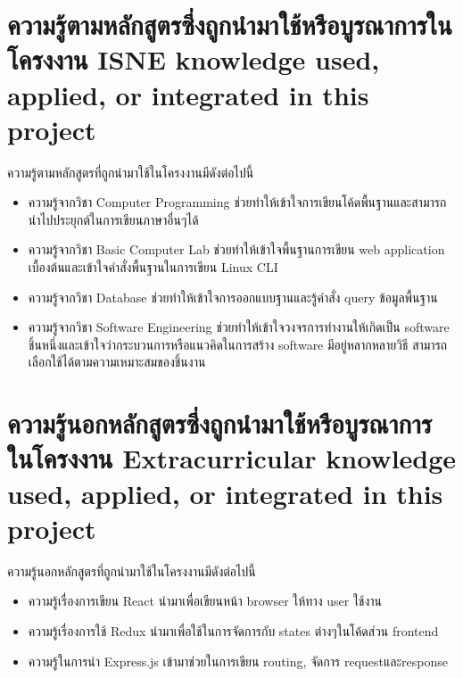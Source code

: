 \section{\ifcpe%
ความรู้ตามหลักสูตรซึ่งถูกนำมาใช้หรือบูรณาการในโครงงาน
\else%
ISNE knowledge used, applied, or integrated in this project
\fi
}

ความรู้ตามหลักสูตรที่ถูกนำมาใช้ในโครงงานมีดังต่อไปนี้
\begin{itemize}
  \item ความรู้จากวิชา Computer Programming ช่วยทำให้เข้าใจการเขียนโค้ดพื้นฐานและสามารถนำไปประยุกต์ในการเขียนภาษาอื่นๆได้
  \item ความรู้จากวิชา Basic Computer Lab ช่วยทำให้เข้าใจพื้นฐานการเขียน web application เบื้องต้นและเข้าใจคำสั่งพื้นฐานในการเขียน Linux CLI
  \item ความรู้จากวิชา Database ช่วยทำให้เข้าใจการออกแบบฐานและรู้คำสั่ง query ข้อมูลพื้นฐาน
  \item ความรู้จากวิชา Software Engineering ช่วยทำให้เข้าใจวงจรการทำงานให้เกิดเป็น software ชิ้นหนึ่งและเข้าใจว่ากระบวนการหรือแนวคิดในการสร้าง software มีอยู่หลากหลายวิธี สามารถเลือกใช้ได้ตามความเหมาะสมของชิ้นงาน 
  
\end{itemize}


\section{\ifcpe%
ความรู้นอกหลักสูตรซึ่งถูกนำมาใช้หรือบูรณาการในโครงงาน
\else%
Extracurricular knowledge used, applied, or integrated in this project
\fi
}

ความรู้นอกหลักสูตรที่ถูกนำมาใช้ในโครงงานมีดังต่อไปนี้
\begin{itemize}
  \item ความรู้เรื่องการเขียน React นำมาเพื่อเขียนหน้า browser ให้ทาง user ใช้งาน
  \item ความรู้เรื่องการใช้ Redux นำมาเพื่อใช้ในการจัดการกับ states ต่างๆในโค้ดส่วน frontend
  \item ความรู้ในการนำ Express.js เข้ามาช่วยในการเขียน routing, จัดการ requestและresponse
\end{itemize}
